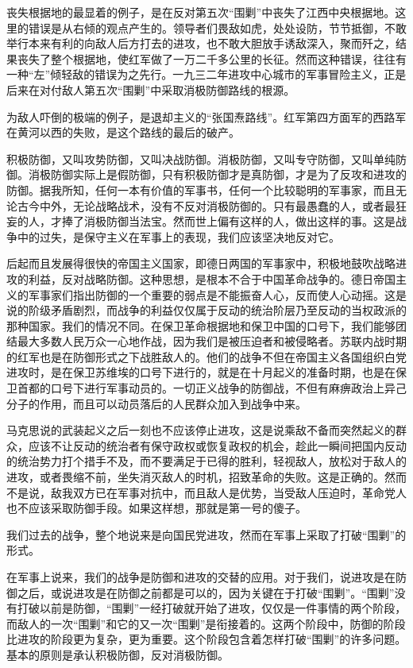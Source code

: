 丧失根据地的最显着的例子，是在反对第五次“围剿”中丧失了江西中央根据地。这里的错误是从右倾的观点产生的。领导者们畏敌如虎，处处设防，节节抵御，不敢举行本来有利的向敌人后方打去的进攻，也不敢大胆放手诱敌深入，聚而歼之，结果丧失了整个根据地，使红军做了一万二千多公里的长征。然而这种错误，往往有一种“左”倾轻敌的错误为之先行。一九三二年进攻中心城市的军事冒险主义，正是后来在对付敌人第五次“围剿”中采取消极防御路线的根源。

为敌人吓倒的极端的例子，是退却主义的“张国焘路线”。红军第四方面军的西路军在黄河以西的失败，是这个路线的最后的破产。

积极防御，又叫攻势防御，又叫决战防御。消极防御，又叫专守防御，又叫单纯防御。消极防御实际上是假防御，只有积极防御才是真防御，才是为了反攻和进攻的防御。据我所知，任何一本有价值的军事书，任何一个比较聪明的军事家，而且无论古今中外，无论战略战术，没有不反对消极防御的。只有最愚蠢的人，或者最狂妄的人，才捧了消极防御当法宝。然而世上偏有这样的人，做出这样的事。这是战争中的过失，是保守主义在军事上的表现，我们应该坚决地反对它。

后起而且发展得很快的帝国主义国家，即德日两国的军事家中，积极地鼓吹战略进攻的利益，反对战略防御。这种思想，是根本不合于中国革命战争的。德日帝国主义的军事家们指出防御的一个重要的弱点是不能振奋人心，反而使人心动摇。这是说的阶级矛盾剧烈，而战争的利益仅仅属于反动的统治阶层乃至反动的当权政派的那种国家。我们的情况不同。在保卫革命根据地和保卫中国的口号下，我们能够团结最大多数人民万众一心地作战，因为我们是被压迫者和被侵略者。苏联内战时期的红军也是在防御形式之下战胜敌人的。他们的战争不但在帝国主义各国组织白党进攻时，是在保卫苏维埃的口号下进行的，就是在十月起义的准备时期，也是在保卫首都的口号下进行军事动员的。一切正义战争的防御战，不但有麻痹政治上异己分子的作用，而且可以动员落后的人民群众加入到战争中来。

马克思说的武装起义之后一刻也不应该停止进攻，这是说乘敌不备而突然起义的群众，应该不让反动的统治者有保守政权或恢复政权的机会，趁此一瞬间把国内反动的统治势力打个措手不及，而不要满足于已得的胜利，轻视敌人，放松对于敌人的进攻，或者畏缩不前，坐失消灭敌人的时机，招致革命的失败。这是正确的。然而不是说，敌我双方已在军事对抗中，而且敌人是优势，当受敌人压迫时，革命党人也不应该采取防御手段。如果这样想，那就是第一号的傻子。

我们过去的战争，整个地说来是向国民党进攻，然而在军事上采取了打破“围剿”的形式。

在军事上说来，我们的战争是防御和进攻的交替的应用。对于我们，说进攻是在防御之后，或说进攻是在防御之前都是可以的，因为关键在于打破“围剿”。“围剿”没有打破以前是防御，“围剿”一经打破就开始了进攻，仅仅是一件事情的两个阶段，而敌人的一次“围剿”和它的又一次“围剿”是衔接着的。这两个阶段中，防御的阶段比进攻的阶段更为复杂，更为重要。这个阶段包含着怎样打破“围剿”的许多问题。基本的原则是承认积极防御，反对消极防御。

